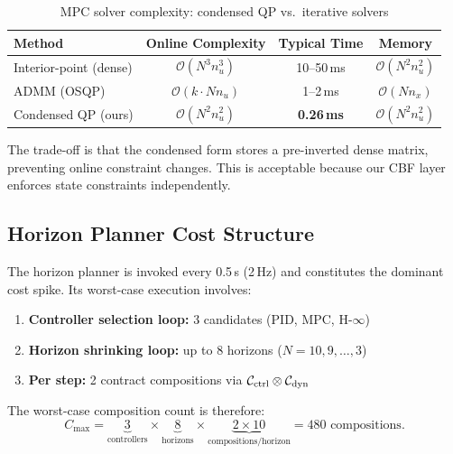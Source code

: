 \begin{table}[htbp]
    \centering
    \caption{MPC solver complexity: condensed QP vs.\ iterative solvers}
    \label{tab:mpc_complexity}
    \begin{tabular}{@{}lccc@{}}
        \toprule
        \textbf{Method} & \textbf{Online Complexity} & \textbf{Typical Time} & \textbf{Memory} \\
        \midrule
        Interior-point (dense) & $\mathcal{O}(N^3 n_u^3)$ & 10--50\,ms & $\mathcal{O}(N^2 n_u^2)$ \\
        ADMM (OSQP) & $\mathcal{O}(k \cdot N n_u)$ & 1--2\,ms & $\mathcal{O}(N n_x)$ \\
        Condensed QP (ours) & $\mathcal{O}(N^2 n_u^2)$ & \textbf{0.26\,ms} & $\mathcal{O}(N^2 n_u^2)$ \\
        \bottomrule
    \end{tabular}
\end{table}

The trade-off is that the condensed form stores a pre-inverted dense matrix, preventing online constraint changes. This is acceptable because our CBF layer enforces state constraints independently.

\subsection{Horizon Planner Cost Structure}
\label{sec:planner_cost}

The horizon planner is invoked every 0.5\,s (2\,Hz) and constitutes the dominant cost spike. Its worst-case execution involves:
\begin{enumerate}
    \item \textbf{Controller selection loop:} 3 candidates (PID, MPC, H-$\infty$)
    \item \textbf{Horizon shrinking loop:} up to 8 horizons ($N = 10, 9, \ldots, 3$)
    \item \textbf{Per step:} 2 contract compositions via $\mathcal{C}_{\mathrm{ctrl}} \otimes \mathcal{C}_{\mathrm{dyn}}$
\end{enumerate}

The worst-case composition count is therefore:
\begin{equation}
    C_{\max} = \underbrace{3}_{\text{controllers}} \times \underbrace{8}_{\text{horizons}} \times \underbrace{2 \times 10}_{\text{compositions/horizon}} = 480 \text{ compositions}.
    \label{eq:worst_case_compositions}
\end{equation}

